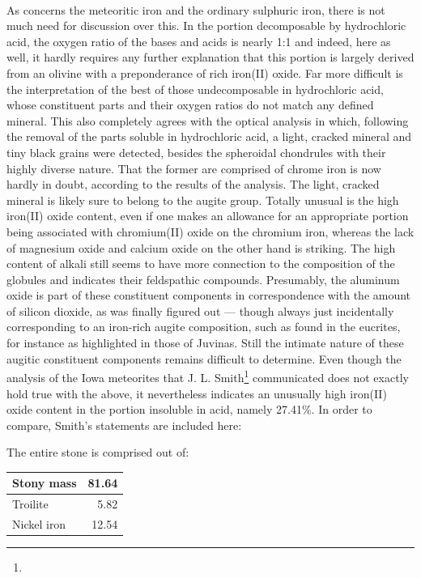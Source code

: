 \documentclass[a4paper, 12pt, oneside]{article}
\begin{document}
\paragraph*{}
As concerns the meteoritic iron and the ordinary sulphuric iron, there is not much need for discussion over this. In the portion decomposable by hydrochloric acid, the oxygen ratio of the bases and acids is nearly 1:1 and indeed, here as well, it hardly requires any further explanation that this portion is largely derived from an olivine with a preponderance of rich iron(II) oxide. Far more difficult is the interpretation of the best of those undecomposable in hydrochloric acid, whose constituent parts and their oxygen ratios do not match any defined mineral. This also completely agrees with the optical analysis in which, following the removal of the parts soluble in hydrochloric acid, a light, cracked mineral and tiny black grains were detected, besides the spheroidal chondrules with their highly diverse nature. That the former are comprised of chrome iron is now hardly in doubt, according to the results of the analysis. The light, cracked mineral is likely sure to belong to the augite group. Totally unusual is the high iron(II) oxide content, even if one makes an allowance for an appropriate portion being associated with chromium(II) oxide on the chromium iron, whereas the lack of magnesium oxide and calcium oxide on the other hand is striking. The high content of alkali still seems to have more connection to the composition of the globules and indicates their feldspathic compounds. Presumably, the aluminum oxide is part of these constituent components in correspondence with the amount of silicon dioxide, as was finally figured out --- though always just incidentally corresponding to an iron-rich augite composition, such as found in the eucrites, for instance as highlighted in those of Juvinas. Still the intimate nature of these augitic constituent components remains difficult to determine. Even though the analysis of the Iowa meteorites that J. L. Smith\footnote{} communicated does not exactly hold true with the above, it nevertheless indicates an unusually high iron(II) oxide content in the portion insoluble in acid, namely 27.41\%. In order to compare, Smith's statements are included here:

The entire stone is comprised out of:
\begin{center}
    \begin{tabular}{ |l|r| } 
    \hline
    Stony mass & 81.64\\\hline
    Troilite & 5.82\\\hline
    Nickel iron & 12.54\\
    \hline
    \end{tabular}
\end{center}
\end{document}

